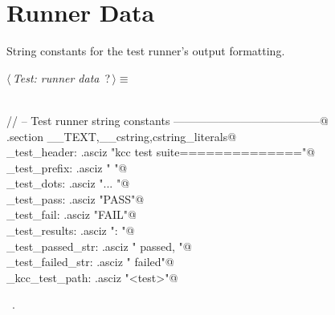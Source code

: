 \documentclass[11pt,a4paper,twoside,openright,DIV=15]{scrbook}
\theoremstyle{definition}
\theoremstyle{plain}
\theoremstyle{remark}
\begin{document}
\section{Runner Data}

String constants for the test runner's output formatting.

\begin{flushleft} \small
\begin{minipage}{\linewidth}\label{scrap75}\raggedright\small
{} $\langle\,${\itshape Test: runner data}\nobreak\ {\footnotesize {?}}$\,\rangle\equiv$
\vspace{-1ex}
\begin{list}{}{} \item
\mbox{}\verb@@\\
\mbox{}\verb@// -- Test runner string constants ---------------------------------------@\\
\mbox{}\verb@.section __TEXT,__cstring,cstring_literals@\\
\mbox{}\verb@_test_header:     .asciz "kcc test suite\n==============\n"@\\
\mbox{}\verb@_test_prefix:     .asciz "  "@\\
\mbox{}\verb@_test_dots:       .asciz "... "@\\
\mbox{}\verb@_test_pass:       .asciz "PASS\n"@\\
\mbox{}\verb@_test_fail:       .asciz "FAIL\n"@\\
\mbox{}\verb@_test_results:    .asciz "\nResults: "@\\
\mbox{}\verb@_test_passed_str: .asciz " passed, "@\\
\mbox{}\verb@_test_failed_str: .asciz " failed\n"@\\
\mbox{}\verb@_kcc_test_path:   .asciz "<test>"@\\
\mbox{}\verb@@{\NWsep}
\end{list}
\vspace{-1.5ex}
\footnotesize
\begin{list}{}{\setlength{\itemsep}{-\parsep}\setlength{\itemindent}{-\leftmargin}}
\item \NWtxtMacroRefIn\ .

\item{}
\end{list}
\end{minipage}\vspace{4ex}
\end{flushleft}
%
\end{document}
